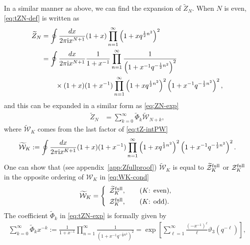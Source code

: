 \documentclass[11pt]{article}
\newcommand{\ri}{{\rm i}}
\newcommand{\hf}{\frac{1}{2}}
\def\til#1{\widetilde{#1}}
\renewcommand{\[}{\begin{eqnarray}}
\renewcommand{\]}{\end{eqnarray}}
\newcommand{\tZ}{{\widetilde Z}}
\newcommand{\tPhi}{{\widetilde\Phi}}
\newcommand{\Zefull}{{\cal Z}^{\text{full}}}
\newcommand{\Zofull}{{\widetilde{\cal Z}}^{\text{full}}}
\begin{document}
In a similar manner as above, we can find the expansion of $\tZ_N$.
When $N$ is even,  \eqref{eq:tZN-def}
is written as
\begin{equation}
\begin{aligned}
 \tZ_N&=\oint\frac{dx}{2\pi\ri x^{N+1}}
(1+x)
 \prod_{n=1}^\infty\left(1+x q^{\hf n^2}\right)^2\\
&=\oint\frac{dx}{2\pi\ri x^{N+1}} \frac{1}{1+x^{-1}}
  \prod_{n=1}^\infty\frac{1}{\left(1+x^{-1}q^{-\hf n^2}\right)^2}\\
&\qquad\times 
(1+x)(1+x^{-1})
 \prod_{n=1}^\infty\left(1+x q^{\hf n^2}\right)^2
            \left(1+x^{-1} q^{-\hf n^2}\right)^2,
\end{aligned}  
\label{eq:tZ-intPW}
\end{equation}
and this can be expanded in a similar form as 
\eqref{eq:ZN-exp}
\begin{align}
\tZ_N
&=\sum_{k=0}^\infty \tPhi_k\til{\mathcal{W}}_{N+k},
\label{eq:tZN-exp}
\end{align}
%
where $\til{\mathcal{W}}_{K}$
comes from the last factor of \eqref{eq:tZ-intPW}
\begin{equation}
\begin{aligned}
 \til{\mathcal{W}}_{K}:=\oint\frac{dx}{2\pi\ri x^{K+1}}
 (1+x)(1+x^{-1})
 \prod_{n=1}^\infty\left(1+x q^{\hf n^2}\right)^2
            \left(1+x^{-1} q^{-\hf n^2}\right)^2.
\end{aligned} 
\end{equation}
One can show that (see appendix~\ref{app:Zfullproof})
$\til{\mathcal{W}}_{K}$ is equal to
$\Zofull_K$ or $\Zefull_K$
in the opposite ordering of
$\mathcal{W}_K$ in \eqref{eq:WK-cond}
\begin{equation}
\begin{aligned}
 \til{\mathcal{W}}_{K}=\left\{\begin{array}{l}
 \Zofull_K, \qquad \mbox{($K$: even)}, \\[1ex]
 \Zefull_K, \qquad \mbox{($K$: odd)}.
         \end{array}\right.
\end{aligned}
\label{eq:tWK-cond}
\end{equation}
The coefficient $\tPhi_k$ in \eqref{eq:tZN-exp} is formally given by
%
\begin{align}
\sum_{k=0}^\infty \tPhi_kx^{-k}
:= \frac{1}{1+x^{-1}}
  \prod_{n=1}^\infty\frac{1}{\left(1+x^{-1}q^{-\hf n^2}\right)^2}
=\exp\left[\sum_{\ell=1}^\infty \frac{(-x^{-1})^\ell}{\ell}
\vartheta_3(q^{-\ell})\right],
\label{eq:tPhi-gen}
\end{align}
\end{document}
